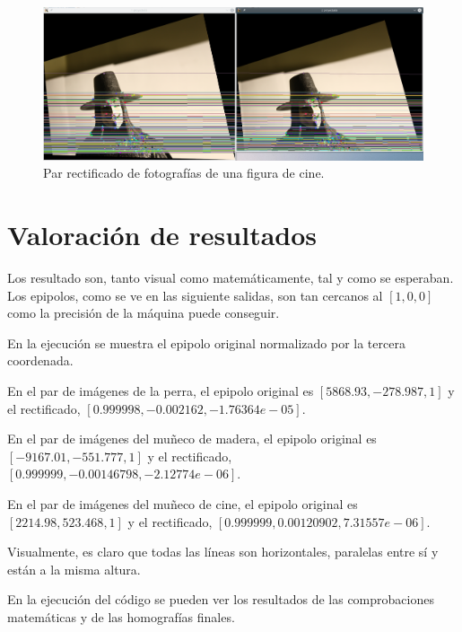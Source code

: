 \documentclass[a4paper, 11pt]{article}
\theoremstyle{definition}
\begin{document}
    \begin{figure}[ht!]
        \centering
        \includegraphics[width=160mm]{V-Proyectado.png}
        \caption{Par rectificado de fotografías de una figura de cine.}
    \end{figure}

    \clearpage
    \section{Valoración de resultados}

    Los resultado son, tanto visual como matemáticamente, tal y como se esperaban. Los epipolos, como se ve en las siguiente salidas, son tan cercanos al $[1, 0, 0]$ como la precisión de la máquina puede conseguir.

    En la ejecución se muestra el epipolo original normalizado por la tercera coordenada.

    En el par de imágenes de la perra, el epipolo original es $[5868.93, -278.987, 1]$ y el rectificado, $[0.999998, -0.002162, -1.76364e-05]$.

    En el par de imágenes del muñeco de madera, el epipolo original es $[-9167.01, -551.777, 1]$ y el rectificado, $[0.999999, -0.00146798, -2.12774e-06]$.

    En el par de imágenes del muñeco de cine, el epipolo original es $[2214.98, 523.468, 1]$ y el rectificado, $[0.999999, 0.00120902, 7.31557e-06]$.

    Visualmente, es claro que todas las líneas son horizontales, paralelas entre sí y están a la misma altura.

    En la ejecución del código se pueden ver los resultados de las comprobaciones matemáticas y de las homografías finales.


    
    
\end{document}
